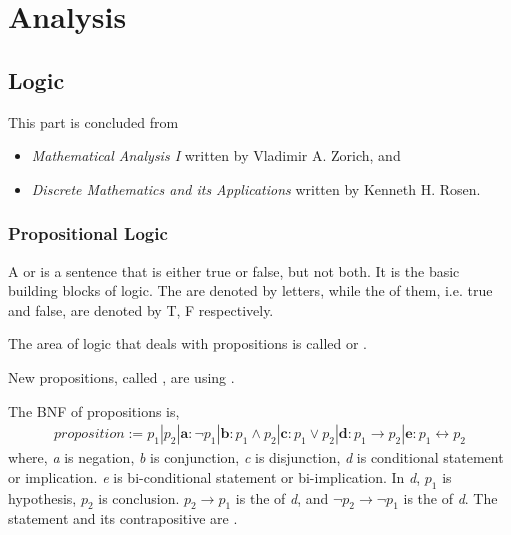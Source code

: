 \section{Analysis}

\subsection{Logic}

This part is concluded from 
\begin{itemize}
  \item \emph{Mathematical Analysis I} written by Vladimir A. Zorich, and
  \item \emph{Discrete Mathematics and its Applications} written by Kenneth H. Rosen.
\end{itemize}

\crule

\subsubsection{Propositional Logic}

A  or  is a  
sentence that is either true or false, but not both.
It is the basic building blocks of logic.
The  are denoted by letters,
while the  of them, 
i.e. true and false, are denoted by T, F respectively.

The area of logic that deals with propositions is called 
 or .

New propositions, called , are 
using 
.

The BNF of propositions is, 
\begin{align*}
  proposition := p_1 | p_2 | 
    \textbf{a}: \neg{p_1} | 
    \textbf{b}: p_1 \wedge p_2 | 
    \textbf{c}: p_1 \vee p_2 | 
    \textbf{d}: p_1 \rightarrow p_2 | 
    \textbf{e}: p_1 \leftrightarrow p_2
\end{align*}
where, \emph{a} is negation, \emph{b} is conjunction, \emph{c} is disjunction,
\emph{d} is conditional statement or implication.
\emph{e} is bi-conditional statement or bi-implication.
In \emph{d}, $p_1$ is hypothesis, $p_2$ is conclusion.
$p_2 \rightarrow p_1$ is the  of \emph{d},
and $\neg{p_2} \rightarrow \neg{p_1}$ is the  of \emph{d}.
The statement and its contrapositive are .


